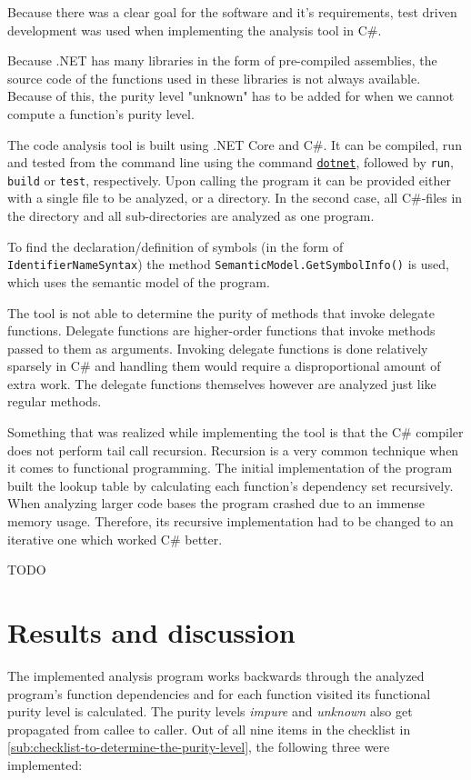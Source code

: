 \documentclass[a4paper,12pt]{article}
\begin{document}

Because there was a clear goal for the software and it's requirements, test driven development was used when implementing the analysis tool in C\#.

Because .NET has many libraries in the form of pre-compiled assemblies, the source code of the functions used in these libraries is not always available. Because of this, the purity level "unknown" has to be added for when we cannot compute a function's purity level.

The code analysis tool is built using .NET Core and C\#. It can be compiled, run and tested from the command line using the command \href{https://docs.microsoft.com/en-us/dotnet/core/tools/}{\texttt{dotnet}}, followed by \texttt{run}, \texttt{build} or \texttt{test}, respectively. Upon calling the program it can be provided either with a single file to be analyzed, or a directory. In the second case, all C\#-files in the directory and all sub-directories are analyzed as one program.

To find the declaration/definition of symbols (in the form of \texttt{IdentifierNameSyn\allowbreak tax}) the method \texttt{SemanticModel.GetSym\allowbreak bolInfo()} is used, which uses the semantic model of the program.

The tool is not able to determine the purity of methods that invoke delegate functions. Delegate functions are higher-order functions that invoke methods passed to them as arguments. Invoking delegate functions is done relatively sparsely in C\# and handling them would require a disproportional amount of extra work. The delegate functions themselves however are analyzed just like regular methods.

Something that was realized while implementing the tool is that the C\# compiler does not perform tail call recursion. Recursion is a very common technique when it comes to functional programming. The initial implementation of the program built the lookup table by calculating each function's dependency set recursively. When analyzing larger code bases the program crashed due to an immense memory usage. Therefore, its recursive implementation had to be changed to an iterative one which worked C\# better.

TODO

\section{Results and discussion} \label{sec:results-and-discussion}
The implemented analysis program works backwards through the analyzed program's function dependencies and for each function visited its functional purity level is calculated. The purity levels \textit{impure} and \textit{unknown} also get propagated from callee to caller. Out of all nine items in the checklist in \autoref{sub:checklist-to-determine-the-purity-level}, the following three were implemented:
\end{document}
